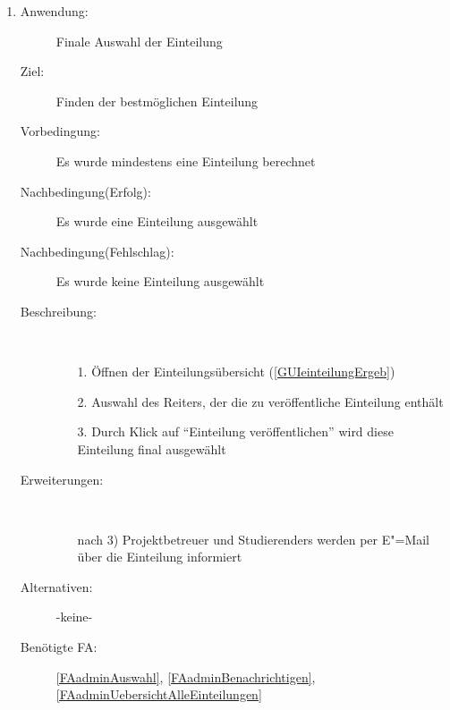 \documentclass[parskip=full]{scrartcl}
\newcommand{\swtLabel}[1]{\textbf{/#1\arabic*0/}}
\begin{document}
\begin{enumerate} [label=\swtLabel{A}]
  
  \item \label{UCadminEinteilungAuswahl}
  \begin{description}
  \item[Anwendung:] Finale Auswahl der \gls{Einteilung}
  \item[Ziel:] Finden der bestmöglichen \gls{Einteilung}
  	\item[Vorbedingung:] Es wurde mindestens eine \gls{Einteilung} berechnet
  	\item[Nachbedingung(Erfolg):] Es wurde eine \gls{Einteilung} ausgewählt
  	\item[Nachbedingung(Fehlschlag):] Es wurde keine \gls{Einteilung} ausgewählt
  	\item[Beschreibung:]~
  	\begin{enumerate} 
  	  \item[1.] Öffnen der \gls{Einteilung}sübersicht (\autoref{GUIeinteilungErgeb})
  	  \item[2.] Auswahl des Reiters, der die zu veröffentliche \gls{Einteilung} enthält
  	  \item[3.] Durch Klick auf \enquote{\gls{Einteilung} veröffentlichen} wird diese
  	  \gls{Einteilung} final ausgewählt 
  	\end{enumerate}
  	\item[Erweiterungen:]~
  	\begin{enumerate}
  	  \item[nach 3)] \gls{Projektbetreuer} und \glspl{Studierender} werden per E"=Mail über die \gls{Einteilung} informiert
  	 \end{enumerate}
  	\item[Alternativen:] -keine-
  	\item[Benötigte FA:] \ref{FAadminAuswahl},
  	 \ref{FAadminBenachrichtigen}, \ref{FAadminUebersichtAlleEinteilungen} 
  \end{description}
  

\end{enumerate}
\end{document}
